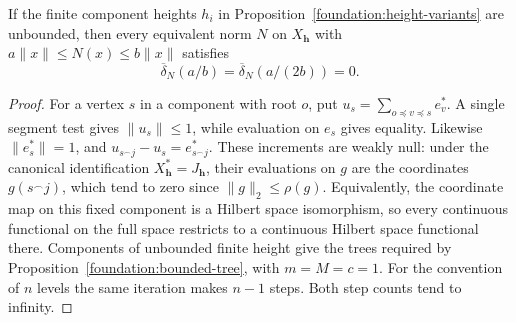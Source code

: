 \begin{corollary}\label{foundation:forest-obstruction}
If the finite component heights $h_i$ in
Proposition~\ref{foundation:height-variants} are unbounded, then every
equivalent norm $N$ on $X_{\boldsymbol h}$ with
$a\|x\|\le N(x)\le b\|x\|$ satisfies
\[
 \overline\delta_N(a/b)=\overline\delta_N(a/(2b))=0.
\]
\end{corollary}
\begin{proof}
For a vertex $s$ in a component with root $o$, put
$u_s=\sum_{o\preceq v\preceq s}e_v^*$. A single segment test gives
$\|u_s\|\le1$, while evaluation on $e_s$ gives equality. Likewise
$\|e_s^*\|=1$, and
$u_{s^\frown j}-u_s=e_{s^\frown j}^*$.
These increments are weakly null: under the canonical identification
$X_{\boldsymbol h}^*=J_{\boldsymbol h}$, their evaluations on $g$
are the coordinates $g(s^\frown j)$, which tend to zero since
$\|g\|_2\le\rho(g)$. Equivalently, the coordinate map on this fixed
component is a Hilbert space isomorphism, so every continuous
functional on the full space restricts to a continuous Hilbert space
functional there. Components of unbounded finite height give the
trees required by Proposition~\ref{foundation:bounded-tree}, with
$m=M=c=1$. For the convention of $n$ levels the same iteration makes
$n-1$ steps. Both step counts tend to infinity.
\end{proof}
